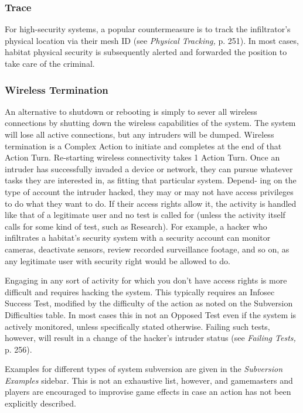 \subsubsection{Trace}

For high-security systems, a popular countermeasure 
is to track the infiltrator's physical location via their 
mesh ID (see \textit{Physical Tracking,} p. 251). In most cases, 
habitat physical security is subsequently alerted and 
forwarded the position to take care of the criminal.

\subsubsection{Wireless Termination}

An alternative to shutdown or rebooting is simply to 
sever all wireless connections by shutting down the 
wireless capabilities of the system. The system will 
lose all active connections, but any intruders will be 
dumped. Wireless termination is a Complex Action to 
initiate and completes at the end of that Action Turn. 
Re-starting wireless connectivity takes 1 Action Turn.
Once an intruder has successfully invaded a device 
or network, they can pursue whatever tasks they are 
interested in, as fitting that particular system. Depend-
ing on the type of account the intruder hacked, they 
may or may not have access privileges to do what 
they want to do. If their access rights allow it, the 
activity is handled like that of a legitimate user and 
no test is called for (unless the activity itself calls for 
some kind of test, such as Research). For example, a 
hacker who infiltrates a habitat's security system with 
a security account can monitor cameras, deactivate 
sensors, review recorded surveillance footage, and so 
on, as any legitimate user with security right would be 
allowed to do.

Engaging in any sort of activity for which you 
don't have access rights is more difficult and requires 
hacking the system. This typically requires an Infosec 
Success Test, modified by the difficulty of the action 
as noted on the Subversion Difficulties table. In most 
cases this in not an Opposed Test even if the system is 
actively monitored, unless specifically stated otherwise. 
Failing such tests, however, will result in a change of 
the hacker's intruder status (see \textit{Failing Tests,} p. 256).

Examples for different types of system subversion 
are given in the \textit{Subversion Examples} sidebar. This 
is not an exhaustive list, however, and gamemasters 
and players are encouraged to improvise game effects 
in case an action has not been explicitly described.

